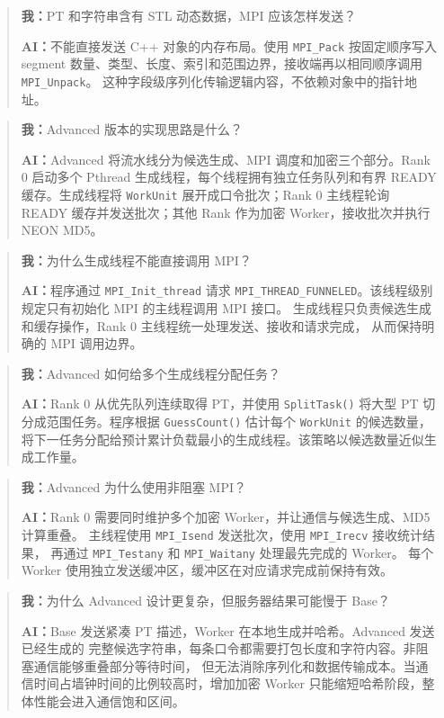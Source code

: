 \documentclass[12pt,a4paper]{ctexart}
\newcommand{\code}[1]{\nolinkurl{#1}}
\newenvironment{dialogue}
  {\begin{quote}\small\setlength{\parskip}{0.45em}}
  {\end{quote}}
\begin{document}
\begin{dialogue}
\textbf{我：}PT 和字符串含有 STL 动态数据，MPI 应该怎样发送？

\textbf{AI：}不能直接发送 C++ 对象的内存布局。使用 \code{MPI\_Pack} 按固定顺序写入
segment 数量、类型、长度、索引和范围边界，接收端再以相同顺序调用 \code{MPI\_Unpack}。
这种字段级序列化传输逻辑内容，不依赖对象中的指针地址。
\end{dialogue}

\begin{dialogue}
\textbf{我：}Advanced 版本的实现思路是什么？

\textbf{AI：}Advanced 将流水线分为候选生成、MPI 调度和加密三个部分。Rank 0 启动多个
Pthread 生成线程，每个线程拥有独立任务队列和有界 READY 缓存。生成线程将
\code{WorkUnit} 展开成口令批次；Rank 0 主线程轮询 READY 缓存并发送批次；其他 Rank
作为加密 Worker，接收批次并执行 NEON MD5。
\end{dialogue}

\begin{dialogue}
\textbf{我：}为什么生成线程不能直接调用 MPI？

\textbf{AI：}程序通过 \code{MPI\_Init\_thread} 请求
\code{MPI\_THREAD\_FUNNELED}。该线程级别规定只有初始化 MPI 的主线程调用 MPI 接口。
生成线程只负责候选生成和缓存操作，Rank 0 主线程统一处理发送、接收和请求完成，
从而保持明确的 MPI 调用边界。
\end{dialogue}

\begin{dialogue}
\textbf{我：}Advanced 如何给多个生成线程分配任务？

\textbf{AI：}Rank 0 从优先队列连续取得 PT，并使用 \code{SplitTask()} 将大型 PT
切分成范围任务。程序根据 \code{GuessCount()} 估计每个 \code{WorkUnit} 的候选数量，
将下一任务分配给预计累计负载最小的生成线程。该策略以候选数量近似生成工作量。
\end{dialogue}

\begin{dialogue}
\textbf{我：}Advanced 为什么使用非阻塞 MPI？

\textbf{AI：}Rank 0 需要同时维护多个加密 Worker，并让通信与候选生成、MD5 计算重叠。
主线程使用 \code{MPI\_Isend} 发送批次，使用 \code{MPI\_Irecv} 接收统计结果，
再通过 \code{MPI\_Testany} 和 \code{MPI\_Waitany} 处理最先完成的 Worker。
每个 Worker 使用独立发送缓冲区，缓冲区在对应请求完成前保持有效。
\end{dialogue}

\begin{dialogue}
\textbf{我：}为什么 Advanced 设计更复杂，但服务器结果可能慢于 Base？

\textbf{AI：}Base 发送紧凑 PT 描述，Worker 在本地生成并哈希。Advanced 发送已经生成的
完整候选字符串，每条口令都需要打包长度和字符内容。非阻塞通信能够重叠部分等待时间，
但无法消除序列化和数据传输成本。当通信时间占墙钟时间的比例较高时，增加加密 Worker
只能缩短哈希阶段，整体性能会进入通信饱和区间。
\end{dialogue}
\end{document}
